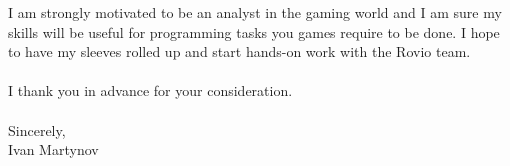 \documentclass[]{article}
\begin{document}
\noindent
I am strongly motivated to be an analyst in the gaming world and I am sure my
skills will be useful for programming tasks you games require to be done. I hope
to have my sleeves rolled up and start hands-on work with the Rovio team.
\\\ \\

\noindent
I thank you in advance for your consideration.\\\ \\

\noindent Sincerely,\\
Ivan Martynov
\end{document}
